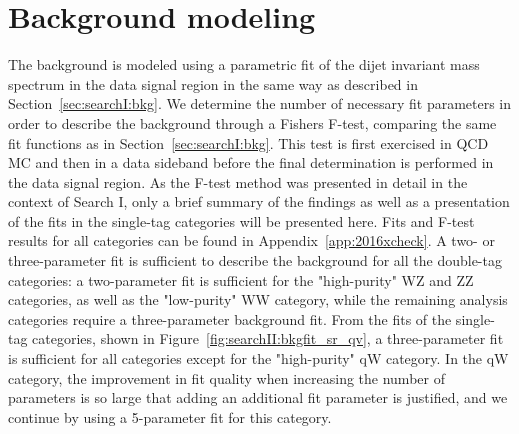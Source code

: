 \section{Background modeling} 
\label{sec:searchII:ftest}
The background is modeled using a parametric fit of the dijet invariant mass spectrum in the data signal region in the same way as described in Section~\ref{sec:searchI:bkg}. We determine the number of necessary fit parameters in order to describe the background through a Fishers F-test, comparing the same fit functions as in Section~\ref{sec:searchI:bkg}. This test is first exercised in QCD MC and then in a data sideband before the final determination is performed in the data signal region. As the F-test method was presented in detail in the context of Search I, only a brief summary of the findings as well as a presentation of the fits in the single-tag categories will be presented here. Fits and F-test results for all categories can be found in Appendix~\ref{app:2016xcheck}. A two- or three-parameter fit is sufficient to describe the background for all the double-tag categories: a two-parameter fit is sufficient for the "high-purity" WZ and ZZ categories, as well as the "low-purity" WW category, while the remaining analysis categories require a three-parameter background fit.
From the fits of the single-tag categories, shown in Figure~\ref{fig:searchII:bkgfit_sr_qv}, a three-parameter fit is sufficient for all categories except for the "high-purity" qW category. In the qW category, the improvement in fit quality when increasing the number
of parameters is so large that adding an additional fit parameter is justified, and we continue by using a 5-parameter fit for this category. 
